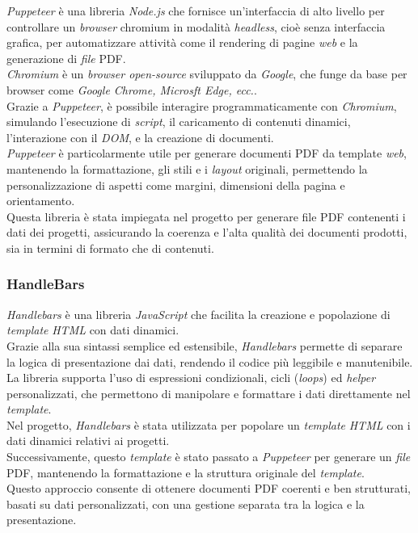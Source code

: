 \textit{Puppeteer} è una libreria \textit{Node.js} che fornisce un'interfaccia di alto livello per controllare un \textit{browser} \gls{chromium} in modalità \textit{headless}, cioè senza interfaccia grafica, per automatizzare attività come il rendering di pagine \textit{web} e la generazione di \textit{file} PDF.\\
\textit{Chromium} è un \textit{browser open-source} sviluppato da \textit{Google}, che funge da base per browser come \textit{Google Chrome, Microsft Edge, ecc.}.\\

\noindent Grazie a \textit{Puppeteer}, è possibile interagire programmaticamente con \textit{Chromium}, simulando l'esecuzione di \textit{script}, il caricamento di contenuti dinamici, l'interazione con il \textit{DOM}, e la creazione di documenti.\\

\noindent \textit{Puppeteer} è particolarmente utile per generare documenti PDF da template \textit{web}, mantenendo la formattazione, gli stili e i \textit{layout} originali, permettendo la personalizzazione di aspetti come margini, dimensioni della pagina e orientamento.\\
Questa libreria è stata impiegata nel progetto per generare file PDF contenenti i dati dei progetti, assicurando la coerenza e l'alta qualità dei documenti prodotti, sia in termini di formato che di contenuti.

\subsubsection{HandleBars}

\textit{Handlebars} è una libreria \textit{JavaScript} che facilita la creazione e popolazione di \textit{template} \textit{HTML} con dati dinamici.\\
Grazie alla sua sintassi semplice ed estensibile, \textit{Handlebars} permette di separare la logica di presentazione dai dati, rendendo il codice più leggibile e manutenibile. \\
La libreria supporta l'uso di espressioni condizionali, cicli (\textit{loops}) ed \textit{helper} personalizzati, che permettono di manipolare e formattare i dati direttamente nel \textit{template}.\\

\pagebreak
\noindent Nel progetto, \textit{Handlebars} è stata utilizzata per popolare un \textit{template} \textit{HTML} con i dati dinamici relativi ai progetti. \\
Successivamente, questo \textit{template} è stato passato a \textit{Puppeteer} per generare un \textit{file} PDF, mantenendo la formattazione e la struttura originale del \textit{template}.\\
Questo approccio consente di ottenere documenti PDF coerenti e ben strutturati, basati su dati personalizzati, con una gestione separata tra la logica e la presentazione.

